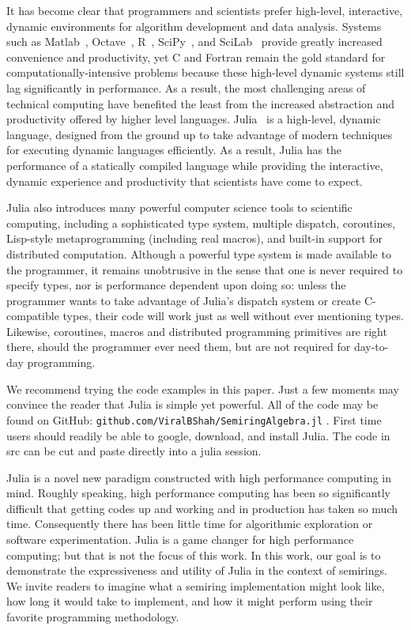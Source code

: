 \documentclass[conference]{IEEEtran}
\begin{document}
It has become clear that programmers and scientists prefer high-level, interactive, dynamic environments for algorithm development and data analysis.
Systems such as Matlab~\cite{matlab}, Octave~\cite{Octave}, R~\cite{Rlang}, SciPy~\cite{numpy}, and SciLab~\cite{scilab} provide greatly increased convenience and productivity, yet C and Fortran remain the gold standard for computationally-intensive problems because these high-level dynamic systems still lag significantly in performance.
As a result, the most challenging areas of technical computing have benefited the least from the increased abstraction and productivity offered by higher level languages.
Julia~\cite{julia} is a high-level, dynamic language, designed from the ground up to take advantage of modern techniques for executing dynamic languages efficiently.
As a result, Julia has the performance of a statically compiled language while providing the interactive, dynamic experience and productivity that scientists have come to expect.

Julia also introduces many powerful computer science tools to scientific computing, including a sophisticated type system, multiple dispatch, coroutines, Lisp-style metaprogramming (including real macros), and built-in support for distributed computation.
Although a powerful type system is made available to the programmer, it remains unobtrusive in the sense that one is never required to specify types, nor is performance dependent upon doing so:
unless the programmer wants to take advantage of Julia's dispatch system or create C-compatible types, their code will work just as well without ever mentioning types.
Likewise, coroutines, macros and distributed programming primitives are right there, should the programmer ever need them, but are not required for day-to-day programming.

We recommend trying the code examples in this paper.
Just a few moments may convince the reader that Julia is simple yet powerful.
All of the code may be found on GitHub:
{\tt github.com/ViralBShah/SemiringAlgebra.jl} .
First time users should readily be able to google, download, and
install Julia. The code in src can be cut and paste directly into a julia session.


Julia is a novel new paradigm constructed with high performance computing in mind.  Roughly speaking, high performance computing has been so significantly difficult that getting codes up and working and in production has taken so much time.
Consequently  there  has been little time for algorithmic exploration or software experimentation.  Julia is a game changer for high performance computing; but that is not the focus of this work.  In this work, our goal is to demonstrate the expressiveness and utility of Julia in the context of semirings.  We invite readers to imagine what a semiring implementation might look like, how long it would take to implement, and  how it might perform using their favorite programming methodology.
 
\end{document}
